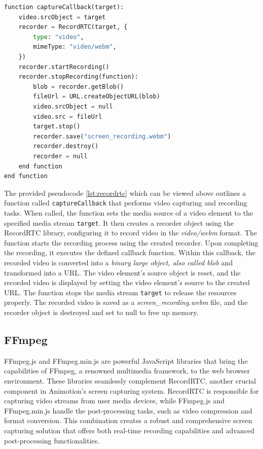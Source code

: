 \begin{lstlisting}[language=Python,caption=Starting the screen capture process,label=lst:recordrtc]
  function captureCallback(target):
    video.srcObject = target
    recorder = RecordRTC(target, {
        type: "video",
        mimeType: "video/webm",
    })
    recorder.startRecording()
    recorder.stopRecording(function):
        blob = recorder.getBlob()
        fileUrl = URL.createObjectURL(blob)
        video.srcObject = null
        video.src = fileUrl
        target.stop()
        recorder.save("screen_recording.webm")
        recorder.destroy()
        recorder = null
    end function
end function
\end{lstlisting}

The provided pseudocode \ref{lst:recordrtc} which can be viewed above outlines a function called \texttt{captureCallback}
that performs video capturing and recording tasks. When called, the function sets the media source of a video 
element to the specified media stream \texttt{target}. It then creates a recorder object using the RecordRTC library, 
configuring it to record video in the \emph{video/webm} format.
The function starts the recording process using the created recorder. Upon completing the recording, 
it executes the defined callback function. Within this callback, the recorded video is converted into a 
\emph{binary large object, also called blob} and transformed into a URL. The video element's source object is reset, and 
the recorded video is displayed by setting the video element's source to the created URL.
The function stops the media stream \texttt{target} to release the resources properly. 
The recorded video is saved as a \emph{screen\_recording.webm} file, and the recorder object is destroyed and set to null to free up memory.

\subsection{FFmpeg}
FFmpeg.js and FFmpeg.min.js are powerful JavaScript libraries that bring the capabilities 
of FFmpeg, a renowned multimedia framework, to the web browser environment. These libraries seamlessly complement 
RecordRTC, another crucial component in Animotion's screen capturing system. RecordRTC is responsible for 
capturing video streams from user media devices, while FFmpeg.js and FFmpeg.min.js handle the post-processing tasks, 
such as video compression and format conversion. This combination creates a robust and comprehensive screen capturing 
solution that offers both real-time recording capabilities and advanced post-processing functionalities.

